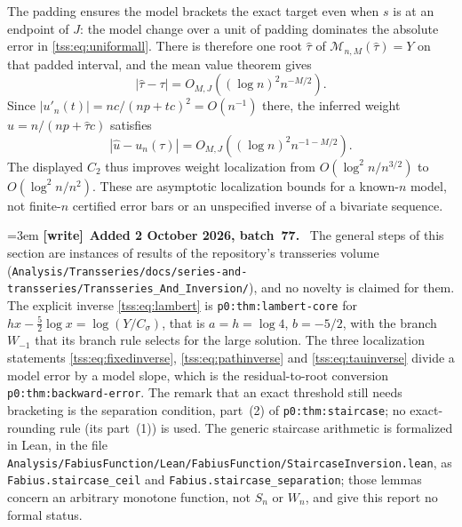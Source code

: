 \documentclass[11pt]{article}
\theoremstyle{remark}\newtheorem{remark}[theorem]{Remark}
\theoremstyle{definition}\newtheorem{definition}[theorem]{Definition}
\newenvironment{writenote}[1][]{\par\smallskip\begingroup\small\emergencystretch=3em
 \noindent\textbf{[write]}\if\relax\detokenize{#1}\relax\else~\textbf{#1.}\fi\ }%
 {\par\endgroup\smallskip}
\begin{document}
The padding ensures the model brackets the exact target even when $s$ is at an endpoint of $J$: the model change over a unit of padding dominates the absolute error in \eqref{tss:eq:uniformall}. There is therefore one root $\widehat\tau$ of $\mathcal M_{n,M}(\widehat\tau)=Y$ on that padded interval, and the mean value theorem gives
\begin{equation}\label{tss:eq:tauinverse}
|\widehat\tau-\tau|=O_{M,J}((\log n)^2n^{-M/2}).
\end{equation}
Since $|u'_n(t)|=nc/(np+tc)^2=O(n^{-1})$ there, the inferred weight
$\widehat u=n/(np+\widehat\tau c)$ satisfies
\begin{equation}\label{tss:eq:weightinverse}
|\widehat u-u_n(\tau)|=O_{M,J}((\log n)^2n^{-1-M/2}).
\end{equation}
The displayed $C_2$ thus improves weight localization from
$O(\log^2 n/n^{3/2})$ to $O(\log^2 n/n^2)$. These are asymptotic localization bounds for a known-$n$ model, not finite-$n$ certified error bars or an unspecified inverse of a bivariate sequence.

\begin{writenote}[Added 2 October 2026, batch~77]
The general steps of this section are instances of results of the repository's
transseries volume
(\texttt{Analysis/\allowbreak Transseries/\allowbreak docs/\allowbreak series-\allowbreak and-\allowbreak transseries/\allowbreak Transseries\_And\_Inversion/}),
and no novelty is claimed for them.
The explicit inverse \eqref{tss:eq:lambert}
is \texttt{p0:thm:lambert-core} for $hx-\tfrac52\log x=\log(Y/C_\sigma)$, that
is $a=h=\log4$, $b=-5/2$, with the branch $W_{-1}$ that its branch rule selects
for the large solution. The three localization statements
\eqref{tss:eq:fixedinverse}, \eqref{tss:eq:pathinverse} and
\eqref{tss:eq:tauinverse} divide a model error by a model slope, which is the
residual-to-root conversion \texttt{p0:thm:backward-error}. The remark that an
exact threshold still needs bracketing is the separation condition, part~(2) of
\texttt{p0:thm:staircase}; no exact-rounding rule (its part~(1)) is used. The
generic staircase arithmetic is formalized in Lean, in the file
\texttt{Analysis/\allowbreak FabiusFunction/\allowbreak Lean/\allowbreak FabiusFunction/\allowbreak StaircaseInversion.lean},
as \texttt{Fabius.staircase\_ceil} and \texttt{Fabius.staircase\_separation};
those lemmas concern an arbitrary monotone function, not $S_n$ or $W_n$, and
give this report no formal status.
\end{writenote}
\end{document}
